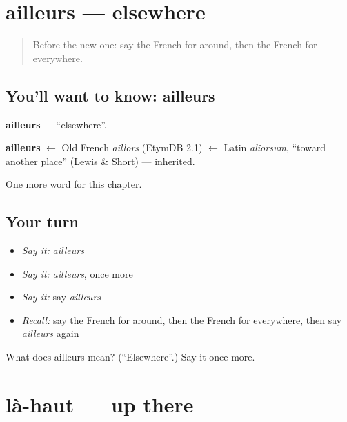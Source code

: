 \section[ailleurs]{ailleurs — elsewhere}

\label{lesson:FR-C216-ailleurs}



\begin{quote}
Before the new one: say the French for around, then the French for everywhere.
\end{quote}

\subsection*{You'll want to know: ailleurs}
\textbf{ailleurs} — \textquotedblleft{}elsewhere\textquotedblright{}.

\begin{cousinweb}
\textbf{ailleurs} $\leftarrow$ Old French \emph{aillors} (EtymDB 2.1) $\leftarrow$ Latin \emph{aliorsum}, \textquotedblleft{}toward another place\textquotedblright{} (Lewis \& Short) — inherited.
\end{cousinweb}

\begin{grammarlens}[title={What you've built}]
One more word for this chapter.
\end{grammarlens}

\subsection*{Your turn}
\begin{itemize}
\raggedright
  \item \emph{Say it:} \emph{ailleurs}
  \item \emph{Say it:} \emph{ailleurs}, once more
  \item \emph{Say it:} say \emph{ailleurs}
  \item \emph{Recall:} say the French for around, then the French for everywhere, then say \emph{ailleurs} again
\end{itemize}

\begin{tcolorbox}[breakable,colback=teal!4,colframe=teal!35!black,title={Before you move on}]
What does ailleurs mean? (\textquotedblleft{}Elsewhere\textquotedblright{}.) Say it once more.
\end{tcolorbox}
\section[là-haut]{là-haut — up there}

